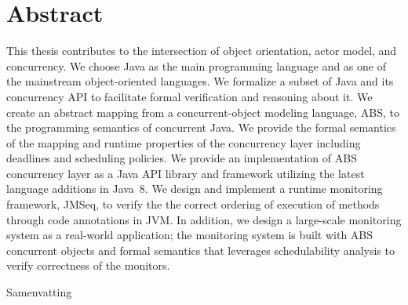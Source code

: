%
\chapter*{Abstract}
\label{sec:abstract}
\vspace*{-10mm}

This thesis contributes to the intersection of object orientation, actor model, and concurrency.
We choose Java as the main programming language and as one of the mainstream 
object-oriented languages. 
We formalize a subset of Java and its concurrency API to 
facilitate formal verification and reasoning about it.
We create an abstract mapping from a concurrent-object modeling language, 
ABS, to the programming semantics of concurrent Java. 
We provide the formal semantics of the mapping and runtime properties of 
the concurrency layer including deadlines and scheduling policies.
We provide an implementation of ABS concurrency layer as a Java API library 
and framework utilizing the latest language additions 
in Java~8.
We design and implement a runtime monitoring framework, JMSeq, to verify the
the correct ordering of execution of methods through code annotations in JVM. 
In addition, we design a large-scale monitoring system as a real-world 
application; the monitoring system is built with ABS concurrent objects 
and formal semantics that leverages schedulability 
analysis to verify correctness of the monitors.

\vspace*{20mm}

{Samenvatting}\label{sec:abstract-diff} \\

